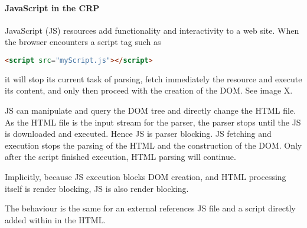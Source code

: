 


\paragraph{JavaScript in the CRP}



JavaScript (JS) resources add functionality and interactivity to a web site.
When the browser encounters a script tag such as

\begin{lstlisting}[language=html, numbers=none]
<script src="myScript.js"></script>
\end{lstlisting}

it will stop its current task of parsing, fetch immediately the resource and execute its content, and only then proceed with the creation of the DOM. %
See image X.

JS can manipulate and query the DOM tree and directly change the HTML file.
As the HTML file is the input stream for the parser,  the parser stops until the JS is downloaded and executed. %
Hence JS is parser blocking.
JS fetching and execution stops the parsing of the HTML and the construction of the DOM.
Only after the script finished execution, HTML parsing will continue.

Implicitly, because JS execution blocks DOM creation, and HTML processing itself is render blocking, JS is also render blocking. %


The behaviour is the same for an external references JS file and a script directly added within in the HTML.





